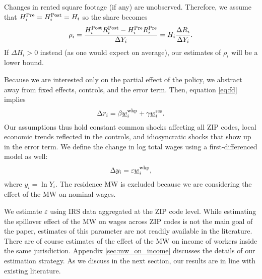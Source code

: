 Changes in rented square footage (if any) are unobserved.
Therefore, we assume that
$H^{\text{Pre}}_i = H^{\text{Post}}_i = H_i$ 
so the share becomes
\begin{equation}\label{eq:share_pocketed}
    \rho_i = \frac{H^{\text{Post}}_i R^{\text{Post}}_i - H^{\text{Pre}}_i R^{\text{Pre}}_i}{\Delta Y_i} = 
                H_i \frac{\Delta R_i}{\Delta Y_i} .
\end{equation}
If $\Delta H_i > 0$ instead (as one would expect on average), 
our estimates of $\rho_i$ will be a lower bound.

Because we are interested only on the partial effect of the policy, we
abstract away from fixed effects, controls, and the error term. 
Then, equation \eqref{eq:fd} implies
\begin{equation}\label{eq:cf_rents_model}
    \Delta r_i = \beta \underline{w}_i^{\text{wkp}} + \gamma \underline{w}_i^{\text{res}} .
\end{equation}
Our assumptions thus hold 
constant common shocks affecting all ZIP codes,
local economic trends reflected in the controls, and
idiosyncratic shocks that show up in the error term.
We define the change in log total wages using a first-differenced model as well:
\begin{equation}\label{eq:cf_wages_model}
    \Delta y_i = \varepsilon \underline{w}_i^{\text{wkp}} ,
\end{equation}
where $y_i=\ln Y_i$.
The residence MW is excluded because we are considering the effect of the MW on 
nominal wages.

We estimate $\varepsilon$ using IRS data aggregated at the ZIP code level.
While estimating the spillover effect of the MW on wages across ZIP codes is 
not the main goal of the paper, 
estimates of this parameter are not readily available in the literature.
There are of course estimates of the effect of the MW on income of workers
inside the same jurisdiction.
Appendix \ref{sec:mw_on_income} discusses the details of our estimation 
strategy.
As we discuss in the next section, our results are in line with existing 
literature.

%
%
%

